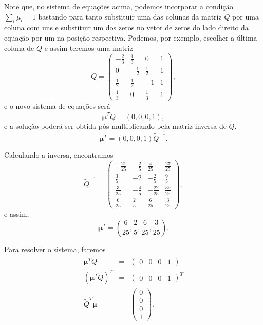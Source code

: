 \begin{questions}
\begin{solution}
\begin{parts}
Note que, no sistema de equações acima, podemos incorporar a condição $\sum_i \mu_i = 1$ bastando
para tanto substituir uma das colunas da matriz $Q$ por uma coluna com uns e substituir
um dos zeros no vetor de zeros do lado direito da equação por um na posição respectiva.
Podemos, por exemplo, escolher a última coluna de $Q$ e assim teremos uma matriz 
\begin{equation}
\tilde{Q} =
\begin{pmatrix} 
-\frac{2}{3} & \frac{1}{3} & 0 & 1 \\
0 & -\frac{1}{2} & \frac{1}{2} & 1 \\
\frac{1}{2} & \frac{1}{2} & -1 & 1 \\
\frac{1}{3} & 0 & \frac{1}{3} & 1
\end{pmatrix} ,
\end{equation}
e o novo sistema de equações será
\begin{equation}
\mathbf{\mu}^T \tilde{Q} = (0, 0, 0, 1) ,
\end{equation}
e a solução poderá ser obtida pós-multiplicando pela matriz inversa de $\tilde{Q}$,
\begin{equation}
\mathbf{\mu}^T = (0, 0, 0, 1) \tilde{Q}^{-1} .
\end{equation}

Calculando a inversa, encontramos
\begin{equation}
\tilde{Q}^{-1} =
\begin{pmatrix} 
-\frac{21}{25} & -\frac{2}{5} & \frac{4}{25} & \frac{27}{25} \\
\frac{3}{5} & -2 & -\frac{2}{5} & \frac{9}{5} \\
\frac{3}{25} & -\frac{4}{5} & -\frac{22}{25} & \frac{39}{25} \\
\frac{6}{25} & \frac{2}{5} & \frac{6}{25} & \frac{3}{25}
\end{pmatrix} ,
\end{equation}
e assim,
\begin{equation}
\mathbf{\mu}^T = (\frac{6}{25}, \frac{2}{5}, \frac{6}{25}, \frac{3}{25}) .
\end{equation}

Para resolver o sistema, faremos
\begin{eqnarray}
\mathbf{\mu}^T \tilde{Q} &=& \begin{pmatrix} 0 & 0 & 0 & 1  \end{pmatrix} \\
\left( \mathbf{\mu}^T \tilde{Q} \right)^T &=& \begin{pmatrix} 0 & 0 & 0 & 1  \end{pmatrix}^T \\
\tilde{Q}^T \mathbf{\mu}  &=& \begin{pmatrix} 0 \\ 0 \\ 0 \\ 1  \end{pmatrix} .
\end{eqnarray}


\end{parts}
\end{solution}
\end{questions}
